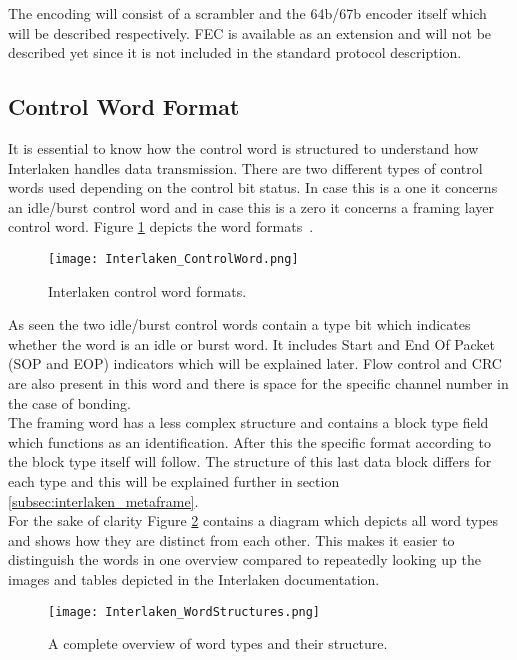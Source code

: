 	The encoding will consist of a scrambler and the 64b/67b encoder itself which will be described respectively. FEC is available as an extension and will not be described yet since it is not included in the standard protocol description.


\subsection{Control Word Format}
	\label{subsec:interlaken_controlword}
	It is essential to know how the control word is structured to understand how Interlaken handles data transmission. There are two different types of control words used depending on the control bit status. In case this is a one it concerns an idle/burst control word and in case this is a zero it concerns a framing layer control word. Figure \ref{Fig:Interlaken_ControlWord} depicts the word formats~\cite{InterlakenProtocol}.
	
	\begin{figure}[H]
		\centering
		\texttt{[image: Interlaken\_ControlWord.png]}	
		\caption{Interlaken control word formats.}
		\label{Fig:Interlaken_ControlWord}
	\end{figure}
	
	As seen the two idle/burst control words contain a type bit which indicates whether the word is an idle or burst word. It includes Start and End Of Packet (SOP and EOP) indicators which will be explained later. Flow control and CRC are also present in this word and there is space for the specific channel number in the case of bonding. \\
	
	The framing word has a less complex structure and contains a block type field which functions as an identification. After this the specific format according to the block type itself will follow. The structure of this last data block differs for each type and this will be explained further in section \ref{subsec:interlaken_metaframe}. \\
	
	For the sake of clarity Figure \ref{Fig:Interlaken_WordStructures} contains a diagram which depicts all word types and shows how they are distinct from each other. This makes it easier to distinguish the words in one overview compared to repeatedly looking up the images and tables depicted in the Interlaken documentation.
	
	\begin{figure}[H]
		\centering
		\texttt{[image: Interlaken\_WordStructures.png]}	
		\caption{A complete overview of word types and their structure.}
		\label{Fig:Interlaken_WordStructures}
	\end{figure}
\newpage


